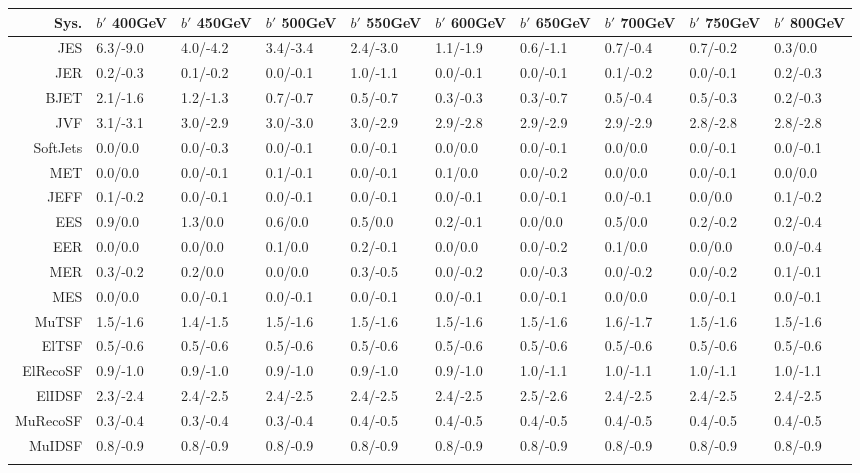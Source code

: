 \begin{tabular}{r|p{.06\linewidth}p{.06\linewidth}p{.06\linewidth}p{.06\linewidth}p{.06\linewidth}p{.06\linewidth}p{.06\linewidth}p{.06\linewidth}p{.06\linewidth}}
\toprule
 Sys.  & $b'$ 400GeV & $b'$ 450GeV & $b'$ 500GeV & $b'$ 550GeV & $b'$ 600GeV & $b'$ 650GeV & $b'$ 700GeV & $b'$ 750GeV & $b'$ 800GeV \\
\toprule
JES  & 6.3/-9.0 & 4.0/-4.2 & 3.4/-3.4 & 2.4/-3.0 & 1.1/-1.9 & 0.6/-1.1 & 0.7/-0.4 & 0.7/-0.2 & 0.3/0.0 \\
JER  & 0.2/-0.3 & 0.1/-0.2 & 0.0/-0.1 & 1.0/-1.1 & 0.0/-0.1 & 0.0/-0.1 & 0.1/-0.2 & 0.0/-0.1 & 0.2/-0.3 \\
BJET  & 2.1/-1.6 & 1.2/-1.3 & 0.7/-0.7 & 0.5/-0.7 & 0.3/-0.3 & 0.3/-0.7 & 0.5/-0.4 & 0.5/-0.3 & 0.2/-0.3 \\
JVF  & 3.1/-3.1 & 3.0/-2.9 & 3.0/-3.0 & 3.0/-2.9 & 2.9/-2.8 & 2.9/-2.9 & 2.9/-2.9 & 2.8/-2.8 & 2.8/-2.8 \\
SoftJets  & 0.0/0.0 & 0.0/-0.3 & 0.0/-0.1 & 0.0/-0.1 & 0.0/0.0 & 0.0/-0.1 & 0.0/0.0 & 0.0/-0.1 & 0.0/-0.1 \\
MET  & 0.0/0.0 & 0.0/-0.1 & 0.1/-0.1 & 0.0/-0.1 & 0.1/0.0 & 0.0/-0.2 & 0.0/0.0 & 0.0/-0.1 & 0.0/0.0 \\
JEFF  & 0.1/-0.2 & 0.0/-0.1 & 0.0/-0.1 & 0.0/-0.1 & 0.0/-0.1 & 0.0/-0.1 & 0.0/-0.1 & 0.0/0.0 & 0.1/-0.2 \\
EES  & 0.9/0.0 & 1.3/0.0 & 0.6/0.0 & 0.5/0.0 & 0.2/-0.1 & 0.0/0.0 & 0.5/0.0 & 0.2/-0.2 & 0.2/-0.4 \\
EER  & 0.0/0.0 & 0.0/0.0 & 0.1/0.0 & 0.2/-0.1 & 0.0/0.0 & 0.0/-0.2 & 0.1/0.0 & 0.0/0.0 & 0.0/-0.4 \\
MER  & 0.3/-0.2 & 0.2/0.0 & 0.0/0.0 & 0.3/-0.5 & 0.0/-0.2 & 0.0/-0.3 & 0.0/-0.2 & 0.0/-0.2 & 0.1/-0.1 \\
MES  & 0.0/0.0 & 0.0/-0.1 & 0.0/-0.1 & 0.0/-0.1 & 0.0/-0.1 & 0.0/-0.1 & 0.0/0.0 & 0.0/-0.1 & 0.0/-0.1 \\
MuTSF  & 1.5/-1.6 & 1.4/-1.5 & 1.5/-1.6 & 1.5/-1.6 & 1.5/-1.6 & 1.5/-1.6 & 1.6/-1.7 & 1.5/-1.6 & 1.5/-1.6 \\
ElTSF  & 0.5/-0.6 & 0.5/-0.6 & 0.5/-0.6 & 0.5/-0.6 & 0.5/-0.6 & 0.5/-0.6 & 0.5/-0.6 & 0.5/-0.6 & 0.5/-0.6 \\
ElRecoSF  & 0.9/-1.0 & 0.9/-1.0 & 0.9/-1.0 & 0.9/-1.0 & 0.9/-1.0 & 1.0/-1.1 & 1.0/-1.1 & 1.0/-1.1 & 1.0/-1.1 \\
ElIDSF  & 2.3/-2.4 & 2.4/-2.5 & 2.4/-2.5 & 2.4/-2.5 & 2.4/-2.5 & 2.5/-2.6 & 2.4/-2.5 & 2.4/-2.5 & 2.4/-2.5 \\
MuRecoSF  & 0.3/-0.4 & 0.3/-0.4 & 0.3/-0.4 & 0.4/-0.5 & 0.4/-0.5 & 0.4/-0.5 & 0.4/-0.5 & 0.4/-0.5 & 0.4/-0.5 \\
MuIDSF  & 0.8/-0.9 & 0.8/-0.9 & 0.8/-0.9 & 0.8/-0.9 & 0.8/-0.9 & 0.8/-0.9 & 0.8/-0.9 & 0.8/-0.9 & 0.8/-0.9 \\
 \\
\bottomrule
\end{tabular}
